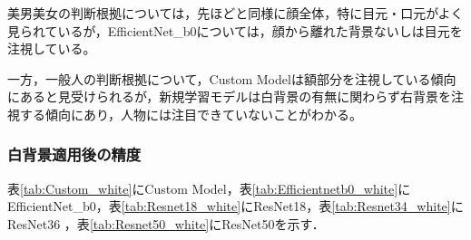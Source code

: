 \documentclass[a4paper,11pt,titlepage]{jsarticle}
\begin{document}
美男美女の判断根拠については，先ほどと同様に顔全体，特に目元・口元がよく見られているが，EfficientNet\_b0については，顔から離れた背景ないしは目元を注視している。\par
一方，一般人の判断根拠について，Custom Modelは額部分を注視している傾向にあると見受けられるが，新規学習モデルは白背景の有無に関わらず右背景を注視する傾向にあり，人物には注目できていないことがわかる。

\subsubsection{白背景適用後の精度}

表\ref{tab:Custom_white}にCustom Model，表\ref{tab:Efficientnetb0_white}にEfficientNet\_b0，表\ref{tab:Resnet18_white}にResNet18，表\ref{tab:Resnet34_white}にResNet36 ，表\ref{tab:Resnet50_white}にResNet50を示す．
\end{document}
